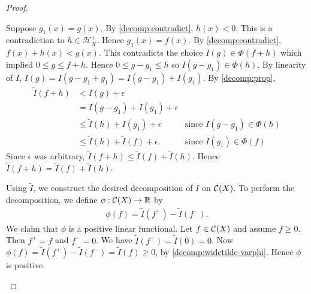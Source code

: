 \begin{proof}
\begin{step}
Suppose $g_1(x) = g(x)$. By \ref{decomp:contradict}, $h (x) < 0$. This is a contradiction to $h \in \mathcal{H}_{X}^+$. Hence $g_1(x) = f(x)$. By \ref{decomp:contradict}, $f(x) + h(x) < g(x)$. This contradicts the choice $I(g) \in \Phi(f + h)$ which implied $0 \leq g \leq f + h$. Hence $0 \leq g - g_1 \leq h$ so $I(g - g_1) \in \Phi(h)$.
By linearity of $I$, $I(g) = I(g - g_1 + g_1) = I(g - g_1) + I(g_1)$.
By \ref{decomp:prop}, 
\begin{align*}
    \widetilde{I} (f + h) &< I(g) + \epsilon & \\
                                &= I(g - g_1) + I(g_1) + \epsilon & \\
                                &\leq \widetilde{I} (h) + I(g_1) + \epsilon & \text{since $I(g - g_1) \in \Phi(h)$} \\
                                &\leq \widetilde{I}(h) + \widetilde{I} (f) + \epsilon.  & \text{since $I(g_1) \in \Phi(f)$}
\end{align*}
Since $\epsilon$ was arbitrary, $\widetilde{I} (f + h) \leq \widetilde{I} (f) + \widetilde{I} (h)$. Hence $\widetilde{I} (f + h) = \widetilde{I} (f) + \widetilde{I} (h)$.
\end{step}
\begin{step}[Generalization to $\C(X)$]
Using $\widetilde{I}$, we construct the desired decomposition of $I$ on $\C(X)$. To perform the decomposition, we define $\phi : {\mathcal C}(X) \to {\mathbb R}$ by
\begin{align*}
    \phi (f) = \widetilde{I}(f^+) - \widetilde{I}(f^-).
\end{align*}
We claim that $\phi$ is a positive linear functional. \newpage
Let $f \in {\mathcal C}(X)$ and assume $f \geq 0$. Then $f^+ = f$ and $f^- = 0$.
We have $\widetilde{I}(f^-) = \widetilde{I}(0) = 0$. Now $\phi(f) = \widetilde{I}(f^+) - \widetilde{I}(f^-) =  \widetilde{I}(f) \geq 0$, by \ref{decomp:widetilde-varphi}. Hence $\phi$ is positive.


\end{step}
\end{proof}

